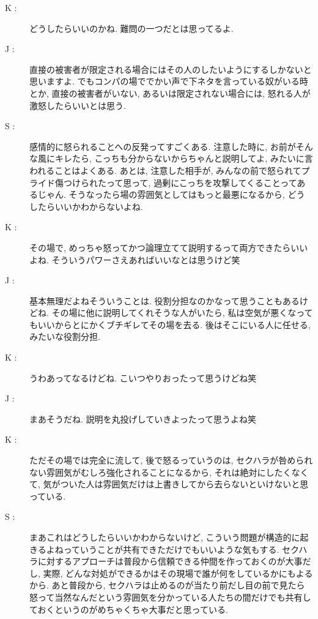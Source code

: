 \documentclass[10pt,b5jsbook,dvips,dvipdfmx,openany]{jsbook}
\theoremstyle{definition}
\begin{document}
\begin{multicols}{2}
\begin{description}
		\item[ K : ] どうしたらいいのかね. 難問の一つだとは思ってるよ.

		\item[ J : ] 直接の被害者が限定される場合にはその人のしたいようにするしかないと思いますよ. でもコンパの場ででかい声で下ネタを言っている奴がいる時とか, 直接の被害者がいない, あるいは限定されない場合には, 怒れる人が激怒したらいいとは思う.

		\item[ S : ] 感情的に怒られることへの反発ってすごくある. 注意した時に, お前がそんな風にキレたら, こっちも分からないからちゃんと説明してよ, みたいに言われることはよくある. あとは, 注意した相手が, みんなの前で怒られてプライド傷つけられたって思って, 過剰にこっちを攻撃してくることってあるじゃん. そうなったら場の雰囲気としてはもっと最悪になるから, どうしたらいいかわからないよね.

		\item[ K : ] その場で, めっちゃ怒ってかつ論理立てて説明するって両方できたらいいよね. そういうパワーさえあればいいなとは思うけど笑

		\item[ J : ] 基本無理だよねそういうことは. 役割分担なのかなって思うこともあるけどね. その場に他に説明してくれそうな人がいたら, 私は空気が悪くなってもいいからとにかくブチギレてその場を去る. 後はそこにいる人に任せる, みたいな役割分担.

		\item[ K : ] うわあってなるけどね. こいつやりおったって思うけどね笑

		\item[ J : ] まあそうだね. 説明を丸投げしていきよったって思うよね笑

		\item[ K : ] ただその場では完全に流して, 後で怒るっていうのは, セクハラが咎められない雰囲気がむしろ強化されることになるから, それは絶対にしたくなくて, 気がついた人は雰囲気だけは上書きしてから去らないといけないと思っている.

		\item[ S : ] まあこれはどうしたらいいかわからないけど, こういう問題が構造的に起きるよねっていうことが共有できただけでもいいような気もする. セクハラに対するアプローチは普段から信頼できる仲間を作っておくのが大事だし, 実際, どんな対処ができるかはその現場で誰が何をしているかにもよるから. あと普段から, セクハラは止めるのが当たり前だし目の前で見たら怒って当然なんだという雰囲気を分かっている人たちの間だけでも共有しておくというのがめちゃくちゃ大事だと思っている.


\end{description}
\end{multicols}
\end{document}
